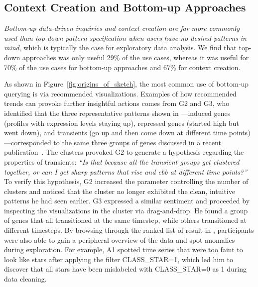 \subsection{Context Creation and Bottom-up Approaches}
\par \emph{Bottom-up data-driven inquiries and context creation are far more commonly used than top-down pattern specification when users have no desired patterns in mind}, which is typically the case for exploratory data analysis. We find that top-down approaches was only useful 29\% of the use cases, whereas it was useful for 70\% of the use cases for bottom-up approaches and 67\% for context creation.
\par As shown in Figure~\ref{fig:origins_of_sketch}, the most common use of bottom-up querying is via recommended visualizations. Examples of how recommended trends can provoke further insightful actions comes from G2 and G3, who identified that the three representative patterns shown in \zvpp---induced genes (profiles with expression levels staying up), repressed genes (started high but went down), and transients (go up and then come down at different time points)---corresponded to the same three groups of genes discussed in a recent publication~\cite{Gloss2017}. The clusters provoked G2 to generate a hypothesis regarding the properties of transients: \textit{``Is that because all the transient groups get clustered together, or can I get sharp patterns that rise and ebb at different time points?''} To verify this hypothesis, G2 increased the parameter controlling the number of clusters and noticed that the cluster no longer exhibited the clean, intuitive patterns he had seen earlier. G3 expressed a similar sentiment and proceeded by inspecting the visualizations in the cluster via drag-and-drop. He found a group of genes that all transitioned at the same timestep, while others transitioned at different timesteps.  By browsing through the ranked list of result in \zvpp, participants were also able to gain a peripheral overview of the data and spot anomalies during exploration. For example, A1 spotted time series that were too faint to look like stars after applying the filter CLASS\_STAR=1, which led him to discover that all stars have been mislabeled with CLASS\_STAR=0 as 1 during data cleaning. 
